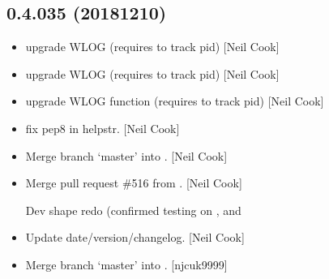 \documentclass[a4paper,10pt,english]{report}
\begin{document}
\subsection{0.4.035 (2018\sphinxhyphen{}12\sphinxhyphen{}10)}
\label{\detokenize{misc/changelog:id261}}\begin{itemize}
\item {} 
 \sphinxhyphen{} upgrade WLOG (requires  to track pid)
{[}Neil Cook{]}

\item {} 
 \sphinxhyphen{} upgrade WLOG (requires  to track pid)
{[}Neil Cook{]}

\item {} 
 \sphinxhyphen{} upgrade WLOG function (requires  to track
pid) {[}Neil Cook{]}

\item {} 
 \sphinxhyphen{} fix pep8 in helpstr. {[}Neil Cook{]}

\item {} 
Merge branch ‘master’ into . {[}Neil Cook{]}

\item {} 
Merge pull request \#516 from . {[}Neil Cook{]}

Dev shape redo (confirmed testing on ,  and 

\item {} 
Update date/version/changelog. {[}Neil Cook{]}

\item {} 
Merge branch ‘master’ into . {[}njcuk9999{]}

\end{itemize}
\end{document}
